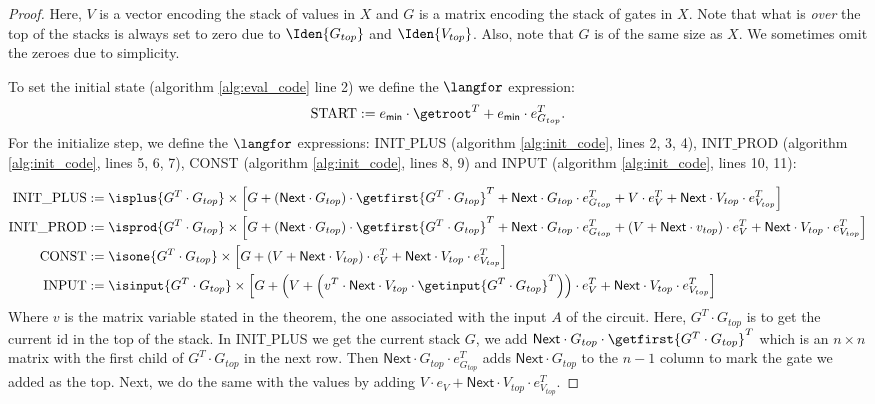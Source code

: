 \begin{proof}
Here, $V$ is a vector encoding the stack of values in $X$ and $G$ is a matrix encoding the stack of gates in $X$.
Note that what is \textit{over} the top of the stacks is always set to zero due to $\Iden{G_{top}}$ and $\Iden{V_{top}}$.
Also, note that $G$ is of the same size as $X$. We sometimes omit the zeroes due to simplicity.

To set the initial state (algorithm \ref{alg:eval_code} line 2) we define the $\langfor$ expression: $$\text{START}:= e_{\mathsf{min}}\cdot \getroot^T + e_{\mathsf{min}}\cdot e_{G_{top}}^T.$$
For the initialize step, we define the $\langfor$ expressions: INIT${\_}$PLUS (algorithm \ref{alg:init_code}, lines 2, 3, 4), INIT${\_}$PROD (algorithm \ref{alg:init_code}, lines 5, 6, 7), CONST (algorithm \ref{alg:init_code}, lines 8, 9) and INPUT (algorithm \ref{alg:init_code}, lines 10, 11):

\begin{align*}
	\text{INIT{\_}PLUS} &:= \isplus{G^T\cdot G_{top}}\times \left[ G + (\mathsf{Next}\cdot G_{top}) \cdot \getfirst{G^T\cdot G_{top}}^T  + \mathsf{Next}\cdot G_{top}\cdot e_{G_{top}}^T +V\cdot e_{V}^T + \mathsf{Next}\cdot V_{top}\cdot e_{V_{top}}^T \right] \\
	\text{INIT{\_}PROD} &:= \isprod{G^T\cdot G_{top}}\times \left[ G + (\mathsf{Next}\cdot G_{top}) \cdot \getfirst{G^T\cdot G_{top}}^T + \mathsf{Next}\cdot G_{top}\cdot e_{G_{top}}^T +(V + \mathsf{Next}\cdot v_{top})\cdot e_{V}^T + \mathsf{Next}\cdot V_{top}\cdot e_{V_{top}}^T \right] \\
	\text{CONST} &:= \isone{G^T\cdot G_{top}}\times \left[ G + (V + \mathsf{Next}\cdot V_{top})\cdot e_{V}^T + \mathsf{Next}\cdot V_{top}\cdot e_{V_{top}}^T \right] \\
	\text{INPUT} &:= \isinput{G^T\cdot G_{top}}\times \left[ G + \left(V + \left( v^T \cdot \mathsf{Next}\cdot V_{top} \cdot \getinput{G^T\cdot G_{top}}^T \right)\right)\cdot e_{V}^T + \mathsf{Next}\cdot V_{top}\cdot e_{V_{top}}^T \right]
\end{align*} 
Where $v$ is the matrix variable stated in the theorem, the one associated with the input $A$ of the circuit.
Here, $G^T\cdot G_{top}$ is to get the current id in the top of the stack. In INIT${\_}$PLUS we get the current stack $G$, we add $\mathsf{Next}\cdot G_{top} \cdot \getfirst{G^T\cdot G_{top}}^T$ which is an $n\times n$ matrix with the first child of $G^T\cdot G_{top}$ in the next row. Then $\mathsf{Next}\cdot G_{top}\cdot e_{G_{top}}^T$ adds $\mathsf{Next}\cdot G_{top}$ to the $n-1$ column to mark the gate we added as the top. Next, we do the same with the values by adding $V\cdot e_{V} + \mathsf{Next}\cdot V_{top}\cdot e_{V_{top}}^T$.


\end{proof}
